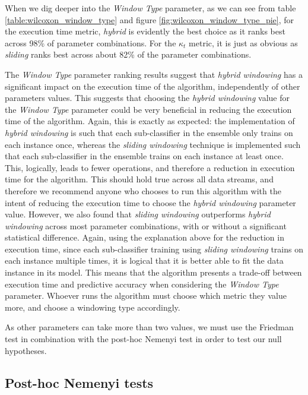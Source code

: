 When we dig deeper into the \textit{Window Type} parameter, as we can see from table \ref{table:wilcoxon_window_type}  and figure \ref{fig:wilcoxon_window_type_pie}, for the execution time metric, \textit{hybrid} is evidently the best choice as it ranks best across 98\% of parameter combinations. For the $\kappa_t$ metric, it is just as obvious as \textit{sliding} ranks best across about 82\% of the parameter combinations. 

The \textit{Window Type} parameter ranking results suggest that \textit{hybrid windowing} has a significant impact on the execution time of the algorithm, independently of other parameters values. This suggests that choosing the \textit{hybrid windowing} value for the \textit{Window Type} parameter could be very beneficial in reducing the execution time of the algorithm. Again, this is exactly as expected: the implementation of \textit{hybrid windowing} is such that each sub-classifier in the ensemble only trains on each instance once, whereas the \textit{sliding windowing} technique is implemented such that each sub-classifier in the ensemble trains on each instance at least once. This, logically, leads to fewer operations, and therefore a reduction in execution time for the algorithm. This should hold true across all data streams, and therefore we recommend anyone who chooses to run this algorithm with the intent of reducing the execution time to choose the \textit{hybrid windowing} parameter value.
However, we also found that \textit{sliding windowing} outperforms \textit{hybrid windowing} across most parameter combinations, with or without a significant statistical difference. Again, using the explanation above for the reduction in execution time, since each sub-classifier training using \textit{sliding windowing} trains on each instance multiple times, it is logical that it is better able to fit the data instance in its model. 
This means that the algorithm presents a trade-off between execution time and predictive accuracy when considering the \textit{Window Type} parameter. Whoever runs the algorithm must choose which metric they value more, and choose a windowing type accordingly.

As other parameters can take more than two values, we must use the Friedman test in combination with the post-hoc Nemenyi test in order to test our null hypotheses.

\subsection{Post-hoc Nemenyi tests}


